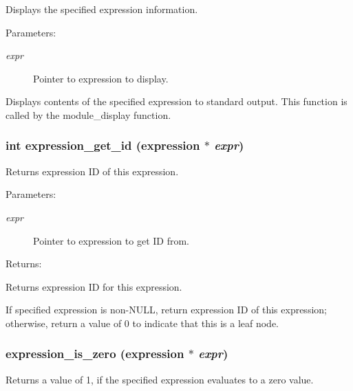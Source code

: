 Displays the specified expression information.

\begin{Desc}
\item[Parameters: ]\par
\begin{description}
\item[{\em 
expr}]Pointer to expression to display.\end{description}
\end{Desc}
Displays contents of the specified expression to standard output. This function is called by the module\_\-display function. 
\subsubsection{\setlength{\rightskip}{0pt plus 5cm}int expression\_\-get\_\-id ({\bf expression} $\ast$ {\em expr})}\label{expr_8h_a3}


Returns expression ID of this expression.

\begin{Desc}
\item[Parameters: ]\par
\begin{description}
\item[{\em 
expr}]Pointer to expression to get ID from. \end{description}
\end{Desc}
\begin{Desc}
\item[Returns: ]\par
Returns expression ID for this expression.\end{Desc}
If specified expression is non-NULL, return expression ID of this expression; otherwise, return a value of 0 to indicate that this is a leaf node. 
\subsubsection{ expression\_\-is\_\-zero ({\bf expression} $\ast$ {\em expr})}\label{expr_8h_a8}


Returns a value of 1, if the specified expression evaluates to a zero value.

